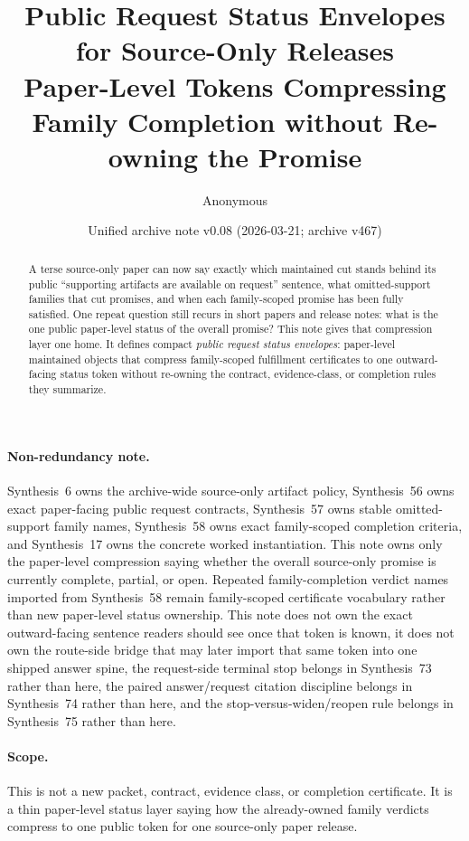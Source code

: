 \documentclass[11pt]{article}
\title{Public Request Status Envelopes for Source-Only Releases\\\large Paper-Level Tokens Compressing Family Completion without Re-owning the Promise}
\author{Anonymous}
\date{Unified archive note v0.08 (2026-03-21; archive v467)}
\begin{document}
\maketitle

\begin{abstract}
A terse source-only paper can now say exactly which maintained cut stands behind its public ``supporting artifacts are available on request'' sentence, what omitted-support families that cut promises, and when each family-scoped promise has been fully satisfied. One repeat question still recurs in short papers and release notes: what is the one public paper-level status of the overall promise? This note gives that compression layer one home. It defines compact \emph{public request status envelopes}: paper-level maintained objects that compress family-scoped fulfillment certificates to one outward-facing status token without re-owning the contract, evidence-class, or completion rules they summarize.
\end{abstract}

\paragraph{Non-redundancy note.}
Synthesis~6 owns the archive-wide source-only artifact policy, Synthesis~56 owns exact paper-facing public request contracts, Synthesis~57 owns stable omitted-support family names, Synthesis~58 owns exact family-scoped completion criteria, and Synthesis~17 owns the concrete worked instantiation.\cite{series:artifactpolicy,series:publicrequestcontracts,series:requestableevidenceclasses,series:requestfulfillmentcertificates,series:workedexample}
This note owns only the paper-level compression saying whether the overall source-only promise is currently complete, partial, or open. Repeated family-completion verdict names imported from Synthesis~58 remain family-scoped certificate vocabulary rather than new paper-level status ownership. This note does not own the exact outward-facing sentence readers should see once that token is known, it does not own the route-side bridge that may later import that same token into one shipped answer spine, the request-side terminal stop belongs in Synthesis~73 rather than here, the paired answer/request citation discipline belongs in Synthesis~74 rather than here, and the stop-versus-widen/reopen rule belongs in Synthesis~75 rather than here.

\paragraph{Scope.}
This is not a new packet, contract, evidence class, or completion certificate.
It is a thin paper-level status layer saying how the already-owned family verdicts compress to one public token for one source-only paper release.
\end{document}
